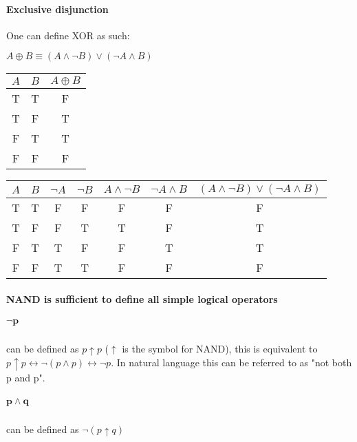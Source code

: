 \documentclass[11pt]{verifica}
\begin{document}
\paragraph*{Exclusive disjunction}
One can define XOR as such:
\begin{center}
    \(A \oplus B \equiv (A \wedge \neg B)\vee(\neg A \wedge B)\)
\end{center}
\begin{center}
    \begin{tabular}{|c|c|c|}
        \hline
        \(A\) & \(B\) & \(A \oplus B\) \\
        \hline
        T & T & F \\
        T & F & T \\
        F & T & T \\
        F & F & F \\
        \hline
    \end{tabular}
    \begin{tabular}{|c|c|c|c|c|c|c|}
        \hline
        \(A\) & \(B\) & \(\neg A\) & \(\neg B\) & \(A \wedge \neg B\) & \(\neg A \wedge B\) & \((A \wedge \neg B)\vee(\neg A \wedge B)\) \\
        \hline
        T & T & F & F & F & F & F \\
        T & F & F & T & T & F & T \\
        F & T & T & F & F & T & T \\
        F & F & T & T & F & F & F \\
        \hline
    \end{tabular}
\end{center}
\paragraph*{NAND is sufficient to define all simple logical operators}
\subparagraph*{\(\bm{\neg p}\)}
can be defined as \(p \uparrow p\) (\(\uparrow\) is the symbol for NAND), this is equivalent to \(p \uparrow p \leftrightarrow \neg(p \wedge p) \leftrightarrow \neg p\). In natural language this can be referred to as "not both p and p".
\subparagraph*{\(\bm{p \wedge q}\)}
can be defined as \(\neg(p \uparrow q)\)
\end{document}
